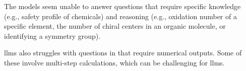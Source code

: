 The models seem unable to answer questions that require specific knowledge (e.g., safety profile of chemicals) and reasoning (e.g., oxidation number of a specific element, the number of chiral centers in an organic molecule, or identifying a symmetry group).

\glspl{llm} also struggles with questions in \chembench that require numerical outputs. Some of these involve multi-step calculations, which can be challenging for \glspl{llm}.\autocite{zhou2023llm_arithmetics}